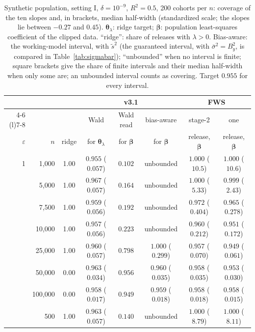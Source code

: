 \documentclass[11pt]{article}
\theoremstyle{definition}
\theoremstyle{plain}
\newcommand{\bbeta}{\boldsymbol{\beta}}
\newcommand{\btheta}{\boldsymbol{\theta}}
\begin{document}
\begin{table}[t]
  \centering
  \small
  \caption{Synthetic population, setting I, $\delta = 10^{-9}$, $R^2 = 0.5$, 200 cohorts per $n$: coverage of the ten slopes and, in brackets, median half-width (standardized scale; the slopes lie between $-0.27$ and $0.45$). $\btheta_\lambda$: ridge target; $\bbeta$: population least-squares coefficient of the clipped data. ``ridge'': share of releases with $\lambda > 0$. Bias-aware: the working-model interval, with $\tilde s^2$ (the guaranteed interval, with $\bar\sigma^2 = B_y^2$, is compared in Table~\ref{tab:sigmabar}); ``unbounded'' when no interval is finite; square brackets give the share of finite intervals and their median half-width when only some are; an unbounded interval counts as covering. Target $0.955$ for every interval.}
  \label{tab:fws_cov}
  \footnotesize
  \setlength{\tabcolsep}{3pt}
  \begin{tabular}{@{}rrcccccc@{}}
    \toprule
    & & & \multicolumn{3}{c}{v3.1} & \multicolumn{2}{c}{FWS} \\
    \cmidrule(lr){4-6} \cmidrule(l){7-8}
    & & & Wald & Wald read & bias-aware & stage-2 & one \\
    $\varepsilon$ & $n$ & ridge & for $\btheta_\lambda$ & for $\bbeta$ & for $\bbeta$ & release, $\bbeta$ & release, $\bbeta$ \\
    \midrule
    1 & 1{,}000 & 1.00 & $0.955$ ($0.057$) & $0.102$ & unbounded & $1.000$ ($10.5$) & $1.000$ ($10.6$) \\
     & 5{,}000 & 1.00 & $0.967$ ($0.057$) & $0.164$ & unbounded & $1.000$ ($5.33$) & $0.999$ ($2.43$) \\
     & 7{,}500 & 1.00 & $0.959$ ($0.056$) & $0.192$ & unbounded & $0.972$ ($0.404$) & $0.965$ ($0.278$) \\
     & 10{,}000 & 1.00 & $0.957$ ($0.056$) & $0.223$ & unbounded & $0.960$ ($0.212$) & $0.951$ ($0.172$) \\
     & 25{,}000 & 1.00 & $0.960$ ($0.057$) & $0.798$ & $1.000$ ($0.299$) & $0.957$ ($0.070$) & $0.949$ ($0.061$) \\
     & 50{,}000 & 0.00 & $0.963$ ($0.034$) & $0.956$ & $0.960$ ($0.035$) & $0.958$ ($0.035$) & $0.953$ ($0.030$) \\
     & 100{,}000 & 0.00 & $0.958$ ($0.017$) & $0.949$ & $0.959$ ($0.018$) & $0.958$ ($0.018$) & $0.958$ ($0.015$) \\
    \addlinespace
    8 & 500 & 1.00 & $0.963$ ($0.057$) & $0.140$ & unbounded & $1.000$ ($8.79$) & $1.000$ ($8.11$) \\

\end{tabular}
\end{table}
\end{document}
